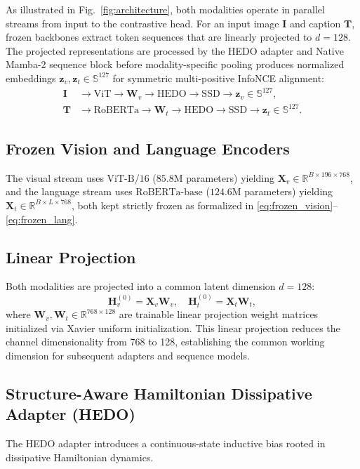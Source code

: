 \documentclass[10pt,journal,final]{IEEEtran}
\begin{document}
As illustrated in Fig.~\ref{fig:architecture}, both modalities operate in parallel streams from input to the contrastive head. For an input image $\mathbf{I}$ and caption $\mathbf{T}$, frozen backbones extract token sequences that are linearly projected to $d=128$. The projected representations are processed by the HEDO adapter and Native Mamba-2 sequence block before modality-specific pooling produces normalized embeddings $\mathbf{z}_v, \mathbf{z}_t \in \mathbb{S}^{127}$ for symmetric multi-positive InfoNCE alignment:
\begin{align}
\mathbf{I} &\to \mathrm{ViT} \to \mathbf{W}_v \to \mathrm{HEDO} \to \mathrm{SSD} \to \mathbf{z}_v \in \mathbb{S}^{127}, \\
\mathbf{T} &\to \mathrm{RoBERTa} \to \mathbf{W}_t \to \mathrm{HEDO} \to \mathrm{SSD} \to \mathbf{z}_t \in \mathbb{S}^{127}.
\end{align}

\subsection{Frozen Vision and Language Encoders}
The visual stream uses $\mathrm{ViT\text{-}B/16}$ ($85.8\text{M}$ parameters) yielding $\mathbf{X}_v \in \mathbb{R}^{B \times 196 \times 768}$, and the language stream uses $\mathrm{RoBERTa\text{-}base}$ ($124.6\text{M}$ parameters) yielding $\mathbf{X}_t \in \mathbb{R}^{B \times L \times 768}$, both kept strictly frozen as formalized in \eqref{eq:frozen_vision}--\eqref{eq:frozen_lang}.

\subsection{Linear Projection}
Both modalities are projected into a common latent dimension $d=128$:
\begin{equation}
\label{eq:projection}
\mathbf{H}_v^{(0)} = \mathbf{X}_v \mathbf{W}_v, \quad \mathbf{H}_t^{(0)} = \mathbf{X}_t \mathbf{W}_t,
\end{equation}
where $\mathbf{W}_v, \mathbf{W}_t \in \mathbb{R}^{768 \times 128}$ are trainable linear projection weight matrices initialized via Xavier uniform initialization. This linear projection reduces the channel dimensionality from 768 to 128, establishing the common working dimension for subsequent adapters and sequence models.

\subsection{Structure-Aware Hamiltonian Dissipative Adapter (HEDO)}
The HEDO adapter introduces a continuous-state inductive bias rooted in dissipative Hamiltonian dynamics.
\end{document}
